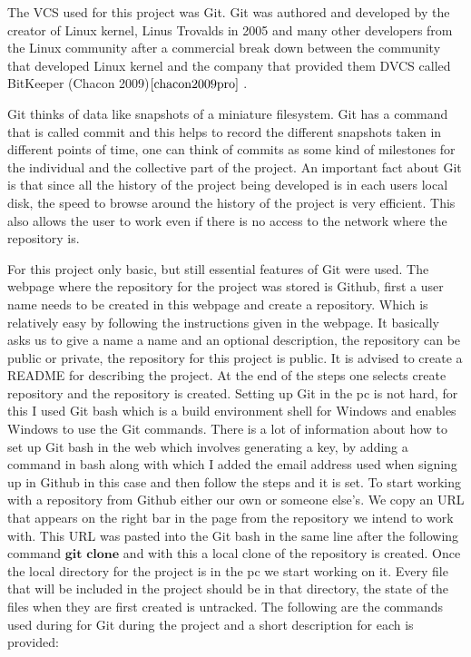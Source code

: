 \documentclass{article}
\begin{document}
The VCS used for this project was Git. Git was authored and developed by the creator of Linux kernel, Linus Trovalds in 2005 and many other developers from the Linux community after a commercial break down between the community that developed Linux kernel and the company that provided them DVCS called BitKeeper (Chacon 2009)$\cite{chacon2009pro}$ . 

Git thinks of data like snapshots of a miniature filesystem. Git has a command that is called commit and this helps to record the different snapshots taken in different points of time, one can think of commits as some kind of milestones for the individual and the collective part of the project. An important fact about Git is that since all the history of the project being developed is in each users local disk, the speed to browse around the history of the project is very efficient. This also allows the user to work even if there is no access to the network where the repository is. 

For this project only basic, but still essential features of Git were used. The webpage where the repository for the project was stored is Github, first a user name needs to be created in this webpage and create a repository. Which is relatively easy by following the instructions given in the webpage. It basically asks us to give a name a name and an optional description, the repository can be public or private, the repository for this project is public. It is advised to create a README for describing the project. At the end of the steps one selects create repository and the repository is created. Setting up Git in the pc is not hard, for this I used Git bash which is a build environment shell for Windows and enables Windows to use the Git commands.
There is a lot of information about how to set up Git bash in the web which involves generating a key, by adding a command in bash along with which I added the email address used when signing up in Github in this case and then follow the steps and it is set. 
To start working with a repository from Github either our own or someone else's. We copy an URL that appears on the right bar in the page from the repository we intend to work with. 
This URL was pasted into the Git bash  in the same line after the following command $\textbf{git clone}$ and with this a local clone of the repository is created.
Once the local directory for the project is in the pc we start working on it. Every file that will be included in the project should be in that directory, the state of the files when they are first created is untracked. The following are the commands used during for Git during the project and a short description for each is provided:
\end{document}
